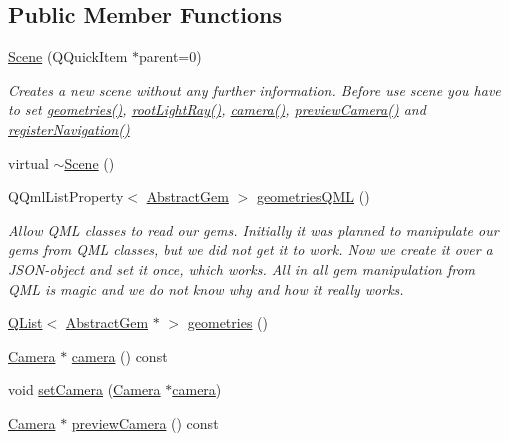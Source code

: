 \subsection*{Public Member Functions}
\begin{DoxyCompactItemize}
\item 
\hyperlink{class_scene_a93f88c89ce94ad70a668225522818b1e}{Scene} (Q\+Quick\+Item $\ast$parent=0)
\begin{DoxyCompactList}\small\item\em Creates a new scene without any further information.  Before use scene you have to set \hyperlink{class_scene_a65753673cd72f8b921cda3ac10c31e87}{geometries()}, \hyperlink{class_scene_a437a4ce938a6de368c2a6abba0ec3f3d}{root\+Light\+Ray()}, \hyperlink{class_scene_ab915c54546b8cecc3ae6bb7c8983518c}{camera()}, \hyperlink{class_scene_ae8f457e7e69cac64f533e02f4f13e725}{preview\+Camera()} and \hyperlink{class_scene_ace3407a4d148d317a20b1bf205554bc5}{register\+Navigation()} \end{DoxyCompactList}\item 
virtual \hyperlink{class_scene_a3b8cec2e32546713915f8c6303c951f1}{$\sim$\+Scene} ()
\item 
Q\+Qml\+List\+Property$<$ \hyperlink{class_abstract_gem}{Abstract\+Gem} $>$ \hyperlink{class_scene_ac437a983a495358875b319a4fcf912d4}{geometries\+Q\+M\+L} ()
\begin{DoxyCompactList}\small\item\em Allow Q\+M\+L classes to read our gems.  Initially it was planned to manipulate our gems from Q\+M\+L classes, but we did not get it to work. Now we create it over a J\+S\+O\+N-\/object and set it once, which works. All in all gem manipulation from Q\+M\+L is magic and we do not know why and how it really works. \end{DoxyCompactList}\item 
\hyperlink{class_q_list}{Q\+List}$<$ \hyperlink{class_abstract_gem}{Abstract\+Gem} $\ast$ $>$ \hyperlink{class_scene_a65753673cd72f8b921cda3ac10c31e87}{geometries} ()
\item 
\hyperlink{class_camera}{Camera} $\ast$ \hyperlink{class_scene_a81b014ae882dfaec147d917b1ea99d68}{camera} () const 
\item 
void \hyperlink{class_scene_a4c722c43b266a642a4a06d0d818b14d1}{set\+Camera} (\hyperlink{class_camera}{Camera} $\ast$\hyperlink{class_scene_ab915c54546b8cecc3ae6bb7c8983518c}{camera})
\item 
\hyperlink{class_camera}{Camera} $\ast$ \hyperlink{class_scene_acdd91b41ac71a9e44b6e9883a30a1c48}{preview\+Camera} () const 

\end{DoxyCompactItemize}
